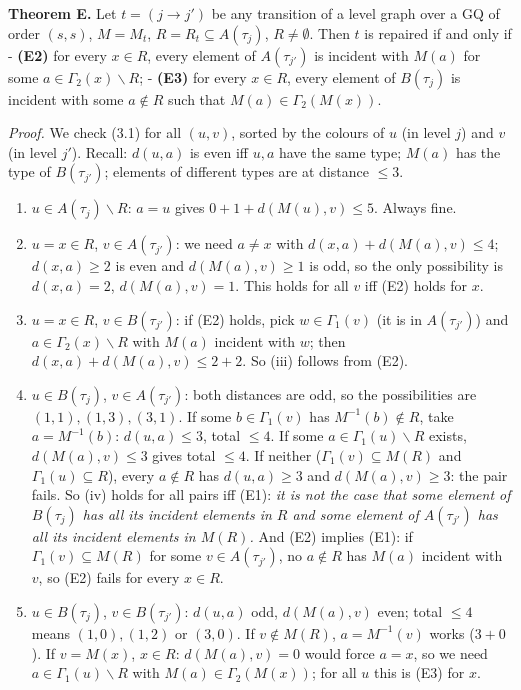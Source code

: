 \documentclass[
  11pt,
]{article}
\begin{document}
\textbf{Theorem E.} Let \(t = (j\to j')\) be any transition of a level
graph over a GQ of order \((s,s)\), \(M = M_t\),
\(R = R_t\subseteq A(\tau_j)\), \(R\ne\emptyset\). Then \(t\) is
repaired if and only if - \textbf{(E2)} for every \(x\in R\), every
element of \(A(\tau_{j'})\) is incident with \(M(a)\) for some
\(a\in\Gamma_2(x)\smallsetminus R\); - \textbf{(E3)} for every
\(x\in R\), every element of \(B(\tau_j)\) is incident with some
\(a\notin R\) such that \(M(a)\in\Gamma_2(M(x))\).

\emph{Proof.} We check (3.1) for all \((u,v)\), sorted by the colours of
\(u\) (in level \(j\)) and \(v\) (in level \(j'\)). Recall: \(d(u,a)\)
is even iff \(u,a\) have the same type; \(M(a)\) has the type of
\(B(\tau_{j'})\); elements of different types are at distance \(\le 3\).

\begin{enumerate}
\def\labelenumi{(\roman{enumi})}
\item
  \(u\in A(\tau_j)\smallsetminus R\): \(a = u\) gives
  \(0+1+d(M(u),v)\le 5\). Always fine.
\item
  \(u = x\in R\), \(v\in A(\tau_{j'})\): we need \(a\ne x\) with
  \(d(x,a)+d(M(a),v)\le 4\); \(d(x,a)\ge 2\) is even and
  \(d(M(a),v)\ge 1\) is odd, so the only possibility is \(d(x,a) = 2\),
  \(d(M(a),v) = 1\). This holds for all \(v\) iff (E2) holds for \(x\).
\item
  \(u = x\in R\), \(v\in B(\tau_{j'})\): if (E2) holds, pick
  \(w\in\Gamma_1(v)\) (it is in \(A(\tau_{j'})\)) and
  \(a\in\Gamma_2(x)\smallsetminus R\) with \(M(a)\) incident with \(w\);
  then \(d(x,a)+d(M(a),v)\le 2+2\). So (iii) follows from (E2).
\item
  \(u\in B(\tau_j)\), \(v\in A(\tau_{j'})\): both distances are odd, so
  the possibilities are \((1,1),(1,3),(3,1)\). If some
  \(b\in\Gamma_1(v)\) has \(M^{-1}(b)\notin R\), take \(a = M^{-1}(b)\):
  \(d(u,a)\le 3\), total \(\le 4\). If some
  \(a\in\Gamma_1(u)\smallsetminus R\) exists, \(d(M(a),v)\le 3\) gives
  total \(\le 4\). If neither (\(\Gamma_1(v)\subseteq M(R)\) and
  \(\Gamma_1(u)\subseteq R\)), every \(a\notin R\) has \(d(u,a)\ge 3\)
  and \(d(M(a),v)\ge 3\): the pair fails. So (iv) holds for all pairs
  iff (E1): \emph{it is not the case that some element of \(B(\tau_j)\)
  has all its incident elements in \(R\) and some element of
  \(A(\tau_{j'})\) has all its incident elements in \(M(R)\).} And (E2)
  implies (E1): if \(\Gamma_1(v)\subseteq M(R)\) for some
  \(v\in A(\tau_{j'})\), no \(a\notin R\) has \(M(a)\) incident with
  \(v\), so (E2) fails for every \(x\in R\).
\item
  \(u\in B(\tau_j)\), \(v\in B(\tau_{j'})\): \(d(u,a)\) odd,
  \(d(M(a),v)\) even; total \(\le 4\) means \((1,0),(1,2)\) or
  \((3,0)\). If \(v\notin M(R)\), \(a = M^{-1}(v)\) works (\(3+0\)). If
  \(v = M(x)\), \(x\in R\): \(d(M(a),v) = 0\) would force \(a = x\), so
  we need \(a\in\Gamma_1(u)\smallsetminus R\) with
  \(M(a)\in\Gamma_2(M(x))\); for all \(u\) this is (E3) for \(x\).
\end{enumerate}
\end{document}
